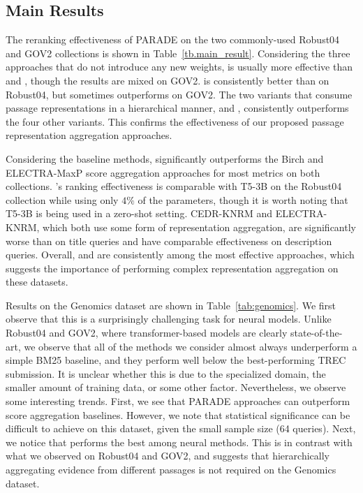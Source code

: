 \subsection{Main Results}
\label{sec:results}

The reranking effectiveness of PARADE on the two commonly-used Robust04 and GOV2 collections is shown in Table~\ref{tb.main_result}.
Considering the three approaches that do not introduce any new weights,  is usually more effective than  and , though the results are mixed on GOV2.
 is consistently better than  on Robust04, but  sometimes outperforms  on GOV2.
The two variants that consume passage representations in a hierarchical manner,  and , consistently outperforms the four other variants.
This confirms the effectiveness of our proposed passage representation aggregation approaches.

Considering the baseline methods,  significantly outperforms the Birch and ELECTRA-MaxP score aggregation approaches for most metrics on both collections.
's ranking effectiveness is comparable with T5-3B on the Robust04 collection while using only $4\%$ of the parameters, though it is worth noting that T5-3B is being used in a zero-shot setting.
CEDR-KNRM and ELECTRA-KNRM, which both use some form of representation aggregation, are significantly worse than  on title queries and have comparable effectiveness on description queries.
Overall,  and  are consistently among the most effective approaches, which suggests the importance of performing complex representation aggregation on these datasets.






Results on the Genomics dataset are shown in Table~\ref{tab:genomics}. We first observe that this is a surprisingly challenging task for neural models. Unlike Robust04 and GOV2, where transformer-based models are clearly state-of-the-art, we observe that all of the methods we consider almost always underperform a simple BM25 baseline, and they perform well below the best-performing TREC submission.
It is unclear whether this is due to the specialized domain, the smaller amount of training data, or some other factor. 
Nevertheless, we observe some interesting trends.
First, we see that PARADE approaches can outperform score aggregation baselines. However, we note that statistical significance can be difficult to achieve on this dataset, given the small sample size (64 queries). Next, we notice that  performs the best among neural methods. This is in contrast with what we observed on Robust04 and GOV2, and suggests that hierarchically aggregating evidence from different passages is not required on the Genomics dataset.

